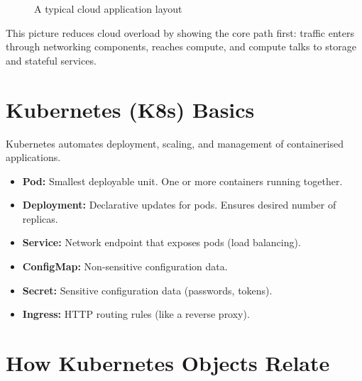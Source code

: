 \documentclass[12pt, a4paper, oneside]{book}
\begin{document}
\begin{figure}[H]
\centering
{}
\caption{A typical cloud application layout}
\label{fig:cloud-layout}
\end{figure}

This picture reduces cloud overload by showing the core path first: traffic enters through networking components, reaches compute, and compute talks to storage and stateful services.

\section{Kubernetes (K8s) Basics}

Kubernetes automates deployment, scaling, and management of containerised applications.

\begin{itemize}[leftmargin=2em]
    \item \textbf{Pod:} Smallest deployable unit. One or more containers running together.
    \item \textbf{Deployment:} Declarative updates for pods. Ensures desired number of replicas.
    \item \textbf{Service:} Network endpoint that exposes pods (load balancing).
    \item \textbf{ConfigMap:} Non-sensitive configuration data.
    \item \textbf{Secret:} Sensitive configuration data (passwords, tokens).
    \item \textbf{Ingress:} HTTP routing rules (like a reverse proxy).
\end{itemize}

\section{How Kubernetes Objects Relate}
\end{document}
